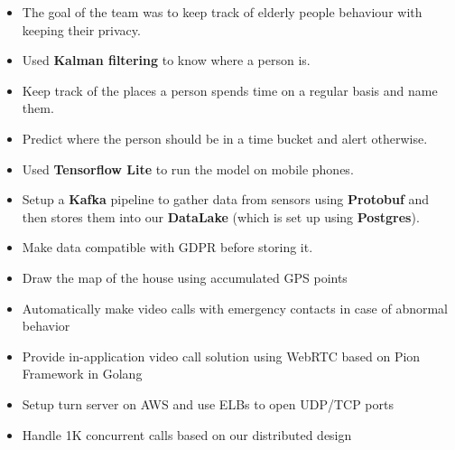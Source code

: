 \vspace{0.5cm}

\begin{itemize}
  \item The goal of the team was to keep track of elderly people behaviour with keeping their privacy.
  \item Used \textbf{Kalman filtering} to know where a person is.
  \item Keep track of the places a person spends time on a regular basis and name them.
  \item Predict where the person should be in a time bucket and alert otherwise.
  \item Used \textbf{Tensorflow Lite} to run the model on mobile phones.
  \item Setup a \textbf{Kafka} pipeline to gather data from sensors using \textbf{Protobuf} and then stores them into our \textbf{DataLake} (which is set up using \textbf{Postgres}).
  \item Make data compatible with GDPR before storing it.
  \item Draw the map of the house using accumulated GPS points
  \item Automatically make video calls with emergency contacts in case of abnormal behavior
  \item Provide in-application video call solution using WebRTC based on Pion Framework in Golang
  \item Setup turn server on AWS and use ELBs to open UDP/TCP ports
  \item Handle 1K concurrent calls based on our distributed design
\end{itemize}
